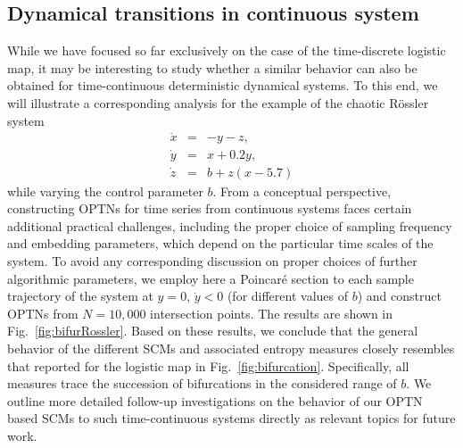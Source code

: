 \documentclass[aip,cha,reprint,nofootinbib]{revtex4-1}
\begin{document}
\subsection{Dynamical transitions in continuous system}\label{sec:cont}

While we have focused so far exclusively on the case of the time-discrete logistic map, it may be interesting to study whether a similar behavior can also be obtained for time-continuous deterministic dynamical systems. To this end, we will illustrate a corresponding analysis for the example of the chaotic R\"ossler system \cite{Roessler1976} 
\begin{eqnarray}
\dot{x} &=& -y-z, \nonumber \\
\dot{y} &=& x+0.2y, \\
\dot{z} &=& b+z(x-5.7) \nonumber
\end{eqnarray}
while varying the control parameter $b$. From a conceptual perspective, constructing OPTNs for time series from continuous systems faces certain additional practical challenges, including the proper choice of sampling frequency and embedding parameters, which depend on the particular time scales of the system. To avoid any corresponding discussion on proper choices of further algorithmic parameters, we employ here a Poincar\'e section to each sample trajectory of the system at $y=0$, $\dot{y}<0$ (for different values of $b$) and construct OPTNs from $N = 10,000$ intersection points. The results are shown in Fig.~\ref{fig:bifurRossler}. Based on these results, we conclude that the general behavior of the different SCMs and associated entropy measures closely resembles that reported for the logistic map in Fig.~\ref{fig:bifurcation}. Specifically, all measures trace the succession of bifurcations in the considered range of $b$. We outline more detailed follow-up investigations on the behavior of our OPTN based SCMs to such time-continuous systems directly as relevant topics for future work.
\end{document}
